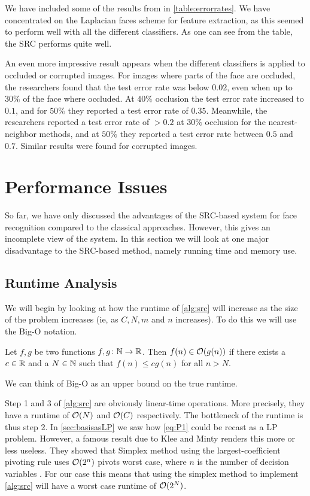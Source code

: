 We have included some of the results from \cite{wright09facerecog} in \cref{table:errorrates}. We have concentrated on the Laplacian faces scheme for feature extraction, as this seemed to perform well with all the different classifiers. As one can see from the table, the SRC performs quite well. 

An even more impressive result appears when the different classifiers is applied to occluded or corrupted images. For images where parts of the face are occluded, the researchers found that the test error rate was below $ 0.02 $, even when up to $ 30\% $ of the face where occluded. At $ 40\% $ occlusion the test error rate increased to $ 0.1 $, and for $ 50\% $ they reported a test error rate of $ 0.35 $. Meanwhile, the researchers reported a test error rate of $ > 0.2 $ at $ 30\% $ occlusion for the nearest-neighbor methods, and at $ 50\% $ they reported a test error rate between $ 0.5 $ and $ 0.7 $. Similar results were found for corrupted images. 




\section{Performance Issues}
So far, we have only discussed the advantages of the SRC-based system for face recognition compared to the classical approaches. However, this gives an incomplete view of the system. In this section we will look at one major disadvantage to the SRC-based method, namely running time and memory use. 

\subsection{Runtime Analysis}
We will begin by looking at how the runtime of \cref{alg:src} will increase as the size of the problem increases (ie, as $ C, N, m $ and $ n $ increases). To do this we will use the Big-O notation.
\begin{definition}
	Let $ f, g $ be two functions $ f, g\colon\mathbb{N}\to\mathbb{R} $. Then $ f(n) \in \mathcal{O}(g(n)) $ if there exists a $ c \in \mathbb{R} $ and a $ N \in \mathbb{N} $ such that $ f(n) \leq cg(n) $ for all $ n > N $.
\end{definition}
\noindent We can think of Big-O as an upper bound on the true runtime.

Step 1 and 3 of \cref{alg:src} are obviously linear-time operations. More precisely, they have a runtime of  $ \mathcal{O}(N) $ and $ \mathcal{O}(C) $ respectively. The bottleneck of the runtime is thus step 2. In \cref{sec:basisasLP} we saw how \eqref{eq:P1} could be recast as a LP problem. However, a famous result due to Klee and Minty renders this more or less useless. They showed that Simplex method using the largest-coefficient pivoting rule uses $ \mathcal{O}(2^{n}) $ pivots worst case, where $ n $ is the number of decision variables \cite[Section~4.4]{vanderbei14linprog}. For our case this means that using the simplex method to implement \cref{alg:src} will have a worst case runtime of $ \mathcal{O}(2^{N}) $.

